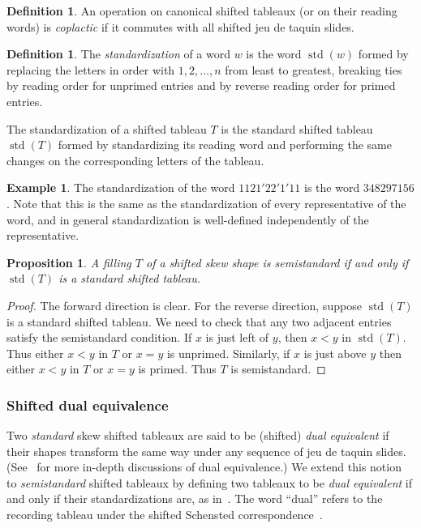 \documentclass[10pt]{amsart}
\newtheorem{prop}[theorem]{Proposition}
\theoremstyle{definition}
\newtheorem{defi}[theorem]{Definition}
\newtheorem{exam}[theorem]{Example}
\DeclareMathOperator{\std}{std}
\begin{document}
\begin{defi}
An operation on canonical shifted tableaux (or on their reading words) is \emph{coplactic} if it commutes with all shifted jeu de taquin slides.
\end{defi}

\begin{defi}
The \emph{standardization} of a word $w$ is the word $\std(w)$ formed by replacing the letters in order with $1,2,\ldots,n$ from least to greatest, breaking ties by reading order for unprimed entries and by reverse reading order for primed entries. 

The standardization of a shifted tableau $T$ is the standard shifted tableau $\std(T)$ formed by standardizing its reading word and performing the same changes on the corresponding letters of the tableau.
\end{defi}

\begin{exam}
The standardization of the word $1121'22'1'11$ is the word 
$348297156$. Note that this is the same as the standardization of every representative of the word, and in general standardization is well-defined independently of the representative.
\end{exam}

\begin{prop}\label{prop:standardization}
A filling $T$ of a shifted skew shape is semistandard if and only if $\std(T)$ is a standard shifted tableau.
\end{prop}

\begin{proof}
The forward direction is clear. For the reverse direction, suppose $\std(T)$ is a standard shifted tableau. We need to check that any two adjacent entries satisfy the semistandard condition. If $x$ is just left of $y$, then $x<y$ in $\std(T)$. Thus either $x<y$ in $T$ or $x=y$ is unprimed. Similarly, if $x$ is just above $y$ then either $x<y$ in $T$ or $x=y$ is primed. Thus $T$ is semistandard.
\end{proof}

\subsubsection{Shifted dual equivalence}

Two \emph{standard} skew shifted tableaux are said to be (shifted) \emph{dual equivalent} if their shapes transform the same way under any sequence of jeu de taquin slides. (See~\cite{Assaf,Haiman} for more in-depth discussions of dual equivalence.) We extend this notion to \emph{semistandard} shifted tableaux by defining two tableaux to be \emph{dual equivalent} if and only if their standardizations are, as in~\cite{SaganBook}. The word ``dual'' refers to the recording tableau under the shifted Schensted correspondence~\cite{Sagan, Worley}. 
\end{document}
